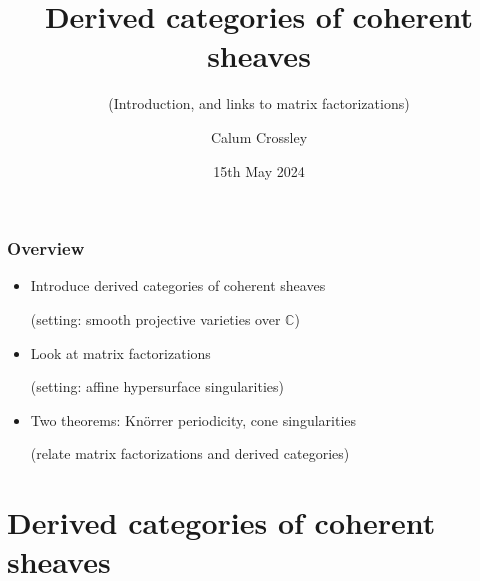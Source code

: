 \documentclass{beamer}
\title{Derived categories of coherent sheaves}
\subtitle{(Introduction, and links to matrix factorizations)}
\date{15th May 2024}
\author{Calum Crossley}
\newcommand{\C}{\mathbb{C}}
\begin{document}
\begin{frame}
    \titlepage
\end{frame}

\begin{frame}
    \frametitle{Overview}

    \begin{itemize}
        \item Introduce derived categories of coherent sheaves

            (setting: smooth projective varieties over $\C$)

        \item Look at matrix factorizations

            (setting: affine hypersurface singularities)

        \item Two theorems: Kn\"orrer periodicity, cone singularities

            (relate matrix factorizations and derived categories)
    \end{itemize}
\end{frame}

\section{Derived categories of coherent sheaves}
\end{document}
